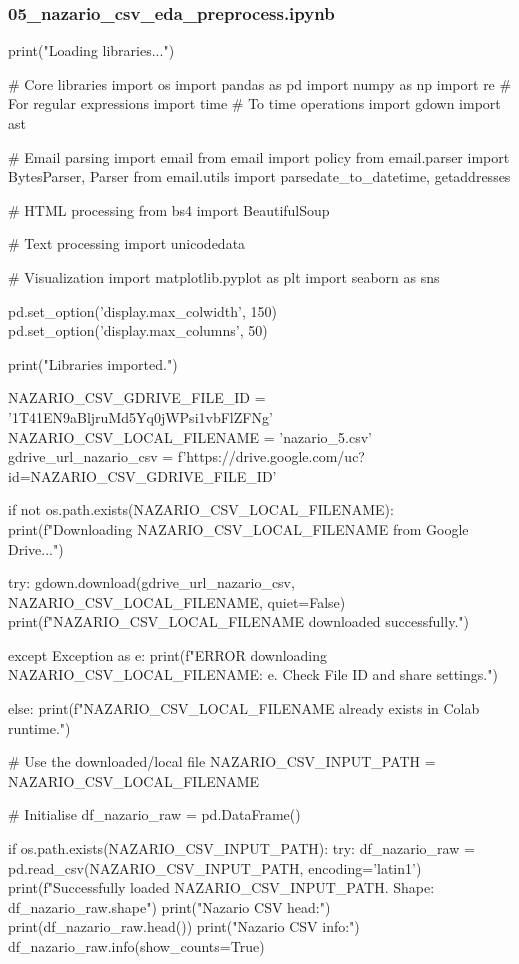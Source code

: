 \subsubsection*{05\_nazario\_csv\_eda\_preprocess.ipynb}

\begin{ffcode}
print("Loading libraries...")

# Core libraries
import os
import pandas as pd
import numpy as np
import re # For regular expressions
import time # To time operations
import gdown
import ast

# Email parsing
import email
from email import policy
from email.parser import BytesParser, Parser
from email.utils import parsedate_to_datetime, getaddresses

# HTML processing
from bs4 import BeautifulSoup

# Text processing
import unicodedata

# Visualization
import matplotlib.pyplot as plt
import seaborn as sns

pd.set_option('display.max_colwidth', 150)
pd.set_option('display.max_columns', 50)

print("Libraries imported.\n")

NAZARIO_CSV_GDRIVE_FILE_ID = '1T41EN9aBljruMd5Yq0jWPsi1vbFlZFNg'
NAZARIO_CSV_LOCAL_FILENAME = 'nazario_5.csv'
gdrive_url_nazario_csv = f'https://drive.google.com/uc?id={NAZARIO_CSV_GDRIVE_FILE_ID}'

if not os.path.exists(NAZARIO_CSV_LOCAL_FILENAME):
    print(f"Downloading {NAZARIO_CSV_LOCAL_FILENAME} from Google Drive...")

    try:
        gdown.download(gdrive_url_nazario_csv, NAZARIO_CSV_LOCAL_FILENAME, quiet=False)
        print(f"{NAZARIO_CSV_LOCAL_FILENAME} downloaded successfully.")

    except Exception as e:
        print(f"ERROR downloading {NAZARIO_CSV_LOCAL_FILENAME}: {e}. Check File ID and share settings.")

else:
    print(f"{NAZARIO_CSV_LOCAL_FILENAME} already exists in Colab runtime.")

# Use the downloaded/local file
NAZARIO_CSV_INPUT_PATH = NAZARIO_CSV_LOCAL_FILENAME

# Initialise
df_nazario_raw = pd.DataFrame()

if os.path.exists(NAZARIO_CSV_INPUT_PATH):
    try:
        df_nazario_raw = pd.read_csv(NAZARIO_CSV_INPUT_PATH, encoding='latin1')
        print(f"Successfully loaded {NAZARIO_CSV_INPUT_PATH}. Shape: {df_nazario_raw.shape}")
        print("\nRaw Nazario CSV head:")
        print(df_nazario_raw.head())
        print("\nRaw Nazario CSV info:")
        df_nazario_raw.info(show_counts=True)


\end{ffcode}
